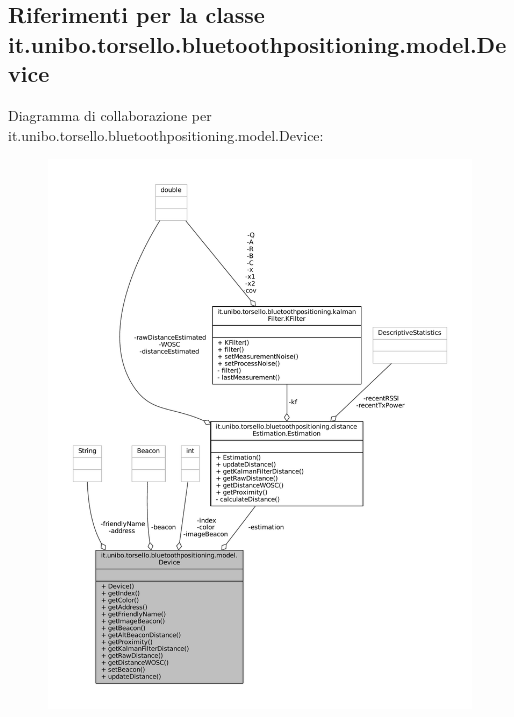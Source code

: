 \hypertarget{classit_1_1unibo_1_1torsello_1_1bluetoothpositioning_1_1model_1_1Device}{}\subsection{Riferimenti per la classe it.\+unibo.\+torsello.\+bluetoothpositioning.\+model.\+Device}
\label{classit_1_1unibo_1_1torsello_1_1bluetoothpositioning_1_1model_1_1Device}


Diagramma di collaborazione per it.\+unibo.\+torsello.\+bluetoothpositioning.\+model.\+Device\+:
\nopagebreak
\begin{figure}[H]
\begin{center}
\leavevmode
\includegraphics[width=350pt]{classit_1_1unibo_1_1torsello_1_1bluetoothpositioning_1_1model_1_1Device__coll__graph}
\end{center}
\end{figure}
